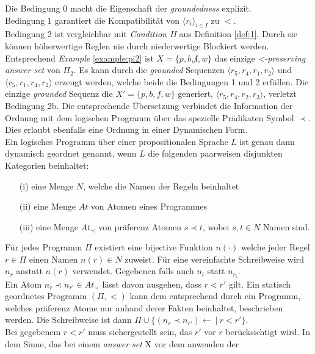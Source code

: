 Die Bedingung 0 macht die Eigenschaft der \emph{groundedness} explizit.\\
Bedingung 1 garantiert die Kompatibilität von $\langle r_i \rangle_{i \in I}$
zu $<$.\\
Bedingung 2 ist vergleichbar mit \emph{Condition II} aus Definition \ref{def:1}.
Durch sie können höherwertige Reglen nie durch niederwertige Blockiert werden.\\
Entsprechend \emph{Example} \ref{example:pi2} ist $X = \{p, b, \not f, w\}$ das
einzige \emph{<-preserving} \emph{answer set} von $\Pi_2$. Es kann durch die 
\emph{grounded} Sequenzen
$\langle r_5, r_4, r_1, r_2 \rangle$ und $\langle r_5, r_1, r_4, r_2 \rangle$
erzeugt werden, welche beide die Bedingungen 1 und 2 erfüllen.
Die einzige \emph{grounded} Sequenz die $X' = \{p, b, f, w\}$ generiert,
$\langle r_5, r_4, r_2, r_3 \rangle$, verletzt Bedingung 2b.
Die entsprechende Übersetzung verbindet die Information der Ordnung
mit dem logischen Programm über das spezielle Prädikaten Symbol $\prec$.
Dies erlaubt ebenfalls eine Ordnung in einer Dynamischen Form.\\
Ein logisches Programm über einer propositionalen Sprache $L$ ist genau
dann dynamisch geordnet genannt, wenn $L$ die folgenden paarweisen disjunkten
Kategorien beinhaltet:
\begin{itemize}
  \item[(i)]   eine Menge $N$, welche die Namen der Regeln beinhaltet
  \item[(ii)]  eine Menge $At$ von Atomen eines Programmes
  \item[(iii)] eine Menge $At_{\prec}$ von präferenz Atomen $s \prec t$,
    wobei $s, t \in N$ Namen sind.
\end{itemize}
Für jedes Programm $\Pi$ existiert eine bijective Funktion $n(\cdot)$ welche jeder
Regel $r \in \Pi$ einen Namen $n(r) \in N$ zuweist.
Für eine vereinfachte Schreibweise wird $n_r$ anstatt $n(r)$ verwendet.
Gegebenen falls auch $n_i$ statt $n_{r_i}$.\\
Ein Atom $n_r \prec n_{r'} \in At_{\prec}$  lässt davon ausgehen, dass
$r < r'$ gilt.
Ein statisch geordnetes Programm $(\Pi, <)$ kann dem entsprechend durch ein
Programm, welches präferenz Atome nur anhand derer Fakten beinhaltet,
beschrieben werden. Die Schreibweise ist dann
$\Pi \cup \{(n_r \prec n_{r'}) \leftarrow~|~r < r'\}$.\\
Bei gegebenem $r < r'$ muss sichergestellt sein, das $r'$ vor $r$ berücksichtigt
wird. In dem Sinne, das bei einem \emph{answer set} X vor dem anwenden der
